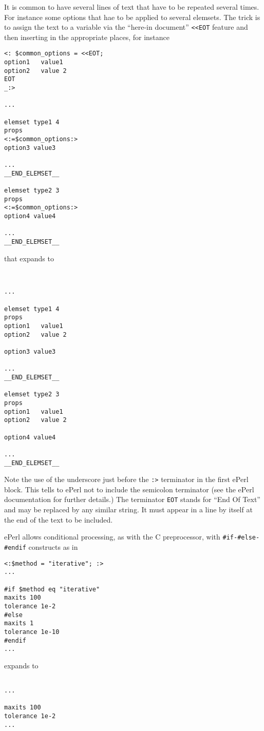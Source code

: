  
It is common to have several lines of text that have to be repeated
several times. For instance some options that hae to be applied to
several elemsets. The trick is to assign the text to a variable via
the ``here-in document'' \verb+<<EOT+ feature and then inserting in
the appropriate places, for instance

\begin{verbatim}
<: $common_options = <<EOT;
option1   value1
option2   value 2
EOT
_:>

...

elemset type1 4
props
<:=$common_options:>
option3 value3

...
__END_ELEMSET__

elemset type2 3
props
<:=$common_options:>
option4 value4

...
__END_ELEMSET__
\end{verbatim}
%
that expands to
%
\begin{verbatim}


...

elemset type1 4
props
option1   value1
option2   value 2

option3 value3

...
__END_ELEMSET__

elemset type2 3
props
option1   value1
option2   value 2

option4 value4

...
__END_ELEMSET__
\end{verbatim}

Note the use of the underscore just before the \verb+:>+ terminator in
the first ePerl block. This tells to ePerl not to include the
semicolon terminator (see the ePerl documentation for further
details.) The terminator \verb+EOT+ stands for ``End Of Text'' and may
be replaced by any similar string. It must appear in a line by itself
at the end of the text to be included. 


%
ePerl allows conditional processing, as with the C preprocessor, with
\verb+#if-#else-#endif+ constructs as in
%
\begin{verbatim}
<:$method = "iterative"; :>
...

#if $method eq "iterative"
maxits 100
tolerance 1e-2
#else
maxits 1
tolerance 1e-10
#endif
...
\end{verbatim}
%
expands to
%
\begin{verbatim}

...

maxits 100
tolerance 1e-2
...
\end{verbatim}


